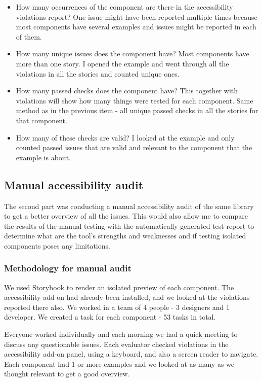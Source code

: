 \documentclass{master_thesis}
\begin{document}
\begin{itemize}
	\item How many occurrences of the component are there in the accessibility violations report? One issue might have been reported multiple times because most components have several examples and issues might be reported in each of them.
	\item How many unique issues does the component have? Most components have more than one story. I opened the example and went through all the violations in all the stories and counted unique ones.
	\item How many passed checks does the component have? This together with violations will show how many things were tested for each component. Same method as in the previous item - all unique passed checks in all the stories for that component.
	\item How many of these checks are valid? I looked at the example and only counted passed issues that are valid and relevant to the component that the example is about.
\end{itemize}

\subsection{Manual accessibility audit}

The second part was conducting a manual accessibility audit of the same library to get a better overview of all the issues. This would also allow me to compare the results of the manual testing with the automatically generated test report to determine what are the tool's strengths and weaknesses and if testing isolated components poses any limitations.

\subsubsection{Methodology for manual audit}
We used Storybook to render an isolated preview of each component.
The accessibility add-on had already been installed, and we looked at the violations reported there also. We worked in a team of 4 people - 3 designers and 1 developer. We created a task for each component - 53 tasks in total.

Everyone worked individually and each morning we had a quick meeting to discuss any questionable issues. Each evaluator checked violations in the accessibility add-on panel, using a keyboard, and also a screen reader to navigate. Each component had 1 or more examples and we looked at as many as we thought relevant to get a good overview.
\end{document}
